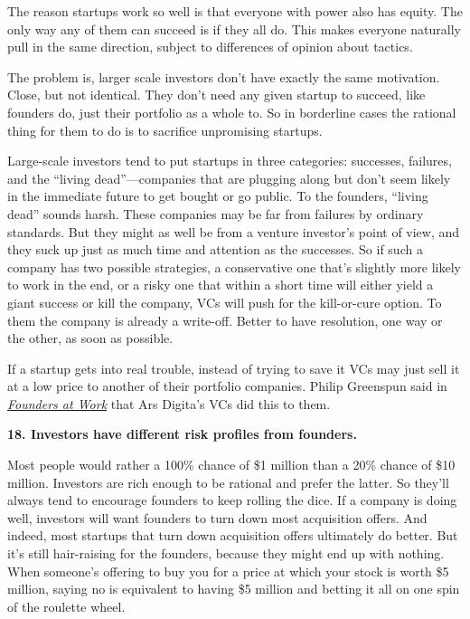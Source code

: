 The reason startups work so well is that everyone with power also has
equity. The only way any of them can succeed is if they all do. This
makes everyone naturally pull in the same direction, subject to
differences of opinion about tactics.

The problem is, larger scale investors don't have exactly the same
motivation. Close, but not identical. They don't need any given startup
to succeed, like founders do, just their portfolio as a whole to. So in
borderline cases the rational thing for them to do is to sacrifice
unpromising startups.

Large-scale investors tend to put startups in three categories:
successes, failures, and the ``living dead''---companies that are
plugging along but don't seem likely in the immediate future to get
bought or go public. To the founders, ``living dead'' sounds harsh.
These companies may be far from failures by ordinary standards. But they
might as well be from a venture investor's point of view, and they suck
up just as much time and attention as the successes. So if such a
company has two possible strategies, a conservative one that's slightly
more likely to work in the end, or a risky one that within a short time
will either yield a giant success or kill the company, VCs will push for
the kill-or-cure option. To them the company is already a write-off.
Better to have resolution, one way or the other, as soon as possible.

If a startup gets into real trouble, instead of trying to save it VCs
may just sell it at a low price to another of their portfolio companies.
Philip Greenspun said in
\href{http://www.amazon.com/gp/product/1590597141}{\emph{Founders at
Work}} that Ars Digita's VCs did this to them.

\textbf{18. Investors have different risk profiles from founders.}

Most people would rather a 100\% chance of \$1 million than a 20\%
chance of \$10 million. Investors are rich enough to be rational and
prefer the latter. So they'll always tend to encourage founders to keep
rolling the dice. If a company is doing well, investors will want
founders to turn down most acquisition offers. And indeed, most startups
that turn down acquisition offers ultimately do better. But it's still
hair-raising for the founders, because they might end up with nothing.
When someone's offering to buy you for a price at which your stock is
worth \$5 million, saying no is equivalent to having \$5 million and
betting it all on one spin of the roulette wheel.

